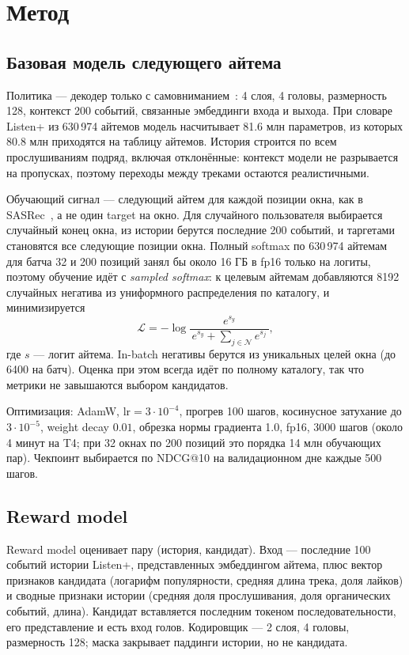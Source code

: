 \section{Метод}

\subsection{Базовая модель следующего айтема}

Политика --- декодер только с самовниманием~\cite{gpt2}: 4 слоя, 4 головы,
размерность 128, контекст 200 событий, связанные эмбеддинги входа и выхода.
При словаре Listen+ из 630\,974 айтемов модель насчитывает 81.6 млн
параметров, из которых 80.8 млн приходятся на таблицу айтемов. История
строится по всем прослушиваниям подряд, включая отклонённые: контекст модели
не разрывается на пропусках, поэтому переходы между треками остаются
реалистичными.

Обучающий сигнал --- следующий айтем для каждой позиции окна, как в
 SASRec~\cite{sasrec}, а не один target на окно. Для
случайного пользователя выбирается случайный конец окна, из истории берутся
последние 200 событий, и таргетами становятся все следующие позиции окна.
Полный softmax по 630\,974 айтемам для батча 32 и 200 позиций занял бы
около 16 ГБ в fp16 только на логиты, поэтому обучение идёт с
\emph{sampled softmax}:
к целевым айтемам добавляются 8192 случайных негатива из униформного
распределения по каталогу, и минимизируется
\begin{equation}
\mathcal{L} = -\log \frac{e^{s_y}}{\,e^{s_y} + \sum_{j\in\mathcal{N}} e^{s_j}\,},
\end{equation}
где $s$ --- логит айтема. In-batch негативы берутся из уникальных целей
окна (до 6400 на батч). Оценка при этом всегда идёт по полному каталогу,
так что метрики не завышаются выбором кандидатов.

Оптимизация: AdamW, $\text{lr}=3\cdot10^{-4}$, прогрев 100 шагов,
косинусное затухание до $3\cdot10^{-5}$, weight decay $0.01$, обрезка нормы
градиента 1.0, fp16, 3000 шагов (около 4 минут на T4; при 32 окнах по 200
позиций это порядка 14 млн обучающих пар). Чекпоинт выбирается по NDCG@10
на валидационном дне каждые 500 шагов.

\subsection{Reward model}
\label{sec:method-rm}

Reward model оценивает пару (история, кандидат). Вход --- последние 100
событий истории Listen+, представленных эмбеддингом айтема, плюс вектор
признаков кандидата (логарифм популярности, средняя длина трека, доля
лайков) и сводные признаки истории (средняя доля прослушивания, доля
органических событий, длина). Кандидат вставляется последним токеном
последовательности, его представление и есть вход голов. Кодировщик ---
2 слоя, 4 головы, размерность 128; маска закрывает паддинги истории, но не
кандидата.

